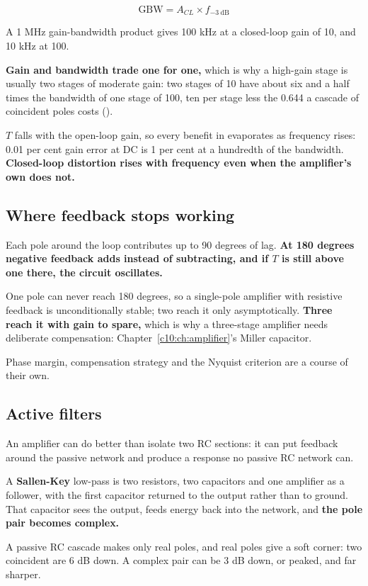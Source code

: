 \[
  \text{GBW} = A_{CL} \times f_{-3\ \text{dB}}
\]

A 1 MHz gain-bandwidth product gives 100 kHz at a closed-loop gain of 10, and 10 kHz at 100.

\textbf{Gain and bandwidth trade one for one,} which is why a high-gain stage is usually two stages of moderate gain: two stages of 10 have about six and a half times the bandwidth of one stage of 100, ten per stage less the 0.644 a cascade of coincident poles costs ().

$T$ falls with the open-loop gain, so every benefit in  evaporates as frequency rises: 0.01 per cent gain error at DC is 1 per cent at a hundredth of the bandwidth. \textbf{Closed-loop distortion rises with frequency even when the amplifier's own does not.}

\subsection{Where feedback stops working}
\label{c4:sec:a5}
Each pole around the loop contributes up to 90 degrees of lag. \textbf{At 180 degrees negative feedback adds instead of subtracting, and if $T$ is still above one there, the circuit oscillates.}

One pole can never reach 180 degrees, so a single-pole amplifier with resistive feedback is unconditionally stable; two reach it only asymptotically. \textbf{Three reach it with gain to spare,} which is why a three-stage amplifier needs deliberate compensation: Chapter~\ref{c10:ch:amplifier}'s Miller capacitor.

Phase margin, compensation strategy and the Nyquist criterion are a course of their own.

\subsection{Active filters}
\label{c4:sec:a6}
An amplifier can do better than isolate two RC sections: it can put feedback around the passive network and produce a response no passive RC network can.

A \textbf{Sallen-Key} low-pass is two resistors, two capacitors and one amplifier as a follower, with the first capacitor returned to the output rather than to ground. That capacitor sees the output, feeds energy back into the network, and \textbf{the pole pair becomes complex.}

A passive RC cascade makes only real poles, and real poles give a soft corner: two coincident are 6 dB down. A complex pair can be 3 dB down, or peaked, and far sharper.

